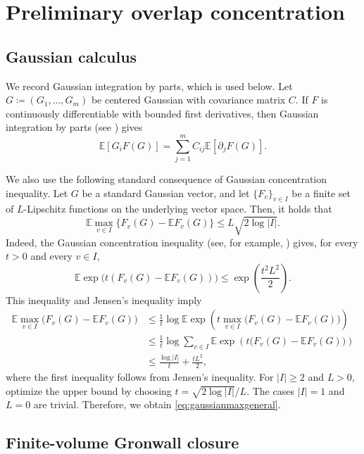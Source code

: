 \documentclass[11pt]{article}
\numberwithin{equation}{section}
\newcommand{\E}{\mathbb{E}}
\newcommand{\1}{\mathbf 1}
\begin{document}
\section{Preliminary overlap concentration}\label{sec:concentration}


\subsection{Gaussian calculus}\label{subsec:gaussian}

We record Gaussian integration by parts, which is used below.  Let
$G\coloneqq(G_1,\ldots,G_m)$ be centered Gaussian with covariance
matrix $C$.
If $F$ is continuously differentiable with bounded first derivatives,
then Gaussian integration by parts (see \cite[Vol. 1, Sec. A.4]{Talagrand}) gives
\begin{equation}
 \E[G_iF(G)]=\sum_{j=1}^m C_{ij}\E[\partial_jF(G)].
 \label{eq:GIBP}
\end{equation}

We also use the following standard consequence of Gaussian concentration inequality. 
Let \(G\) be a standard Gaussian vector, and let $\{ F_v\} _{v\in I}$ be a finite set of $L$-Lipschitz functions on the underlying vector space.
Then, it holds that
\begin{equation}
 \mathbb{E}\max_{v\in I}\{F_v (G) -\E F_v (G)\}
 \le L\sqrt{2\log|I|}.
 \label{eq:gaussianmaxgeneral}
\end{equation}
Indeed, the Gaussian concentration inequality (see, for example,
\cite{Ledoux}) gives, for every \(t>0\)
and every \(v\in I\),
\[
 \mathbb{E}\exp\bigl(t(F_v(G) -\E F_v (G))\bigr)
 \le \exp\left(\frac{t^2L^2}{2}\right).
\]
This inequality and Jensen's inequality imply
\[ \begin{aligned}
\mathbb{E}\max_{v\in I}\bigl(F_v(G)-\E F_v(G)\bigr) &\le \frac1t\log \E\exp\left( t\max_{v\in I}\bigl(F_v(G)-\E F_v(G)\bigr) \right)\\ &\le \frac1t\log \sum_{v\in I} \E\exp\left(t\bigl(F_v(G)-\E F_v(G)\bigr)\right)\\
&\le \frac{\log|I|}{t}+\frac{tL^2}{2}, \end{aligned} \] 
where the first inequality follows from Jensen's inequality. 
For $|I|\ge2$ and $L>0$, optimize the upper bound by choosing
$t=\sqrt{2\log|I|}/L$.  The cases $|I|=1$ and $L=0$ are trivial.
Therefore, we obtain \eqref{eq:gaussianmaxgeneral}.
\subsection{Finite-volume Gronwall closure}\label{subsec:gronwall}
\end{document}
